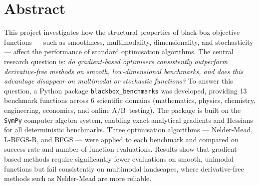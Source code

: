 \setlength{\parindent}{1.25cm}
\onehalfspacing
\pagestyle{plain}




\clearpage
\setcounter{page}{2}

{
  \hypersetup{linkcolor=black}
  \tableofcontents
}
\clearpage

\section*{Abstract}

This project investigates how the structural properties of black-box objective
functions — such as smoothness, multimodality, dimensionality, and stochasticity
— affect the performance of standard optimisation algorithms. The central
research question is: \emph{do gradient-based optimisers consistently
outperform derivative-free methods on smooth, low-dimensional benchmarks, and
does this advantage disappear on multimodal or stochastic functions?} To answer
this question, a Python package \texttt{blackbox\_benchmarks} was developed,
providing 13 benchmark functions across 6 scientific domains (mathematics,
physics, chemistry, engineering, economics, and online A/B~testing). The package
is built on the \texttt{SymPy} computer algebra system, enabling exact
analytical gradients and Hessians for all deterministic benchmarks. Three
optimisation algorithms — Nelder-Mead, L-BFGS-B, and BFGS — were applied to
each benchmark and compared on success rate and number of function evaluations.
Results show that gradient-based methods require significantly fewer evaluations
on smooth, unimodal functions but fail consistently on multimodal landscapes,
where derivative-free methods such as Nelder-Mead are more reliable.

